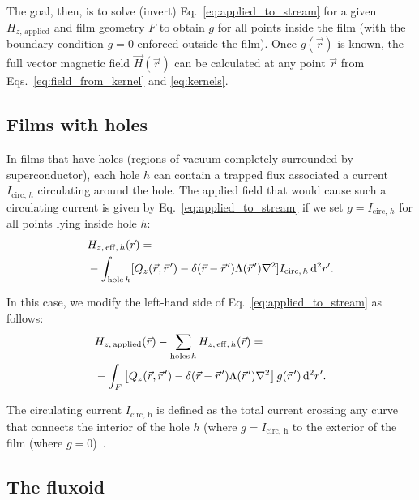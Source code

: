 \documentclass[final,3p,times,twocolumn]{elsarticle}
\newcommand{\pvec}[1]{\vec{#1}\mkern2mu\vphantom{#1}}
\newcounter{bla}
\begin{document}
The goal, then, is to solve (invert) Eq.~\ref{eq:applied_to_stream} for a given $H_{z,\,\mathrm{applied}}$ and film geometry $F$ to obtain $g$ for all points inside the film (with the boundary condition $g=0$ enforced outside the film). Once $g(\vec{r})$ is known, the full vector magnetic field $\vec{H}(\vec{r})$ can be calculated at any point $\vec{r}$
from Eqs.~\ref{eq:field_from_kernel} and \ref{eq:kernels}.

\subsection{Films with holes}
\label{section:model:holes}

In films that have holes (regions of vacuum completely surrounded by superconductor), each hole $h$ can contain a trapped flux associated a current $I_{\mathrm{circ},\,h}$ circulating around the hole. The applied field that would cause such a circulating current is given by Eq.~\ref{eq:applied_to_stream} if we set $g=I_{\mathrm{circ},\,h}$ for all points lying inside hole $h$:
\begin{align}
\begin{split}
    \label{eq:Heff}
    &H_{z,\,\mathrm{eff},\,h}(\vec{r}) = \\
    &-\int_{\mathrm{hole}\,h}[
        Q_z(\vec{r},\pvec{r}')-\delta(\vec{r}-\pvec{r}')\Lambda(\pvec{r}')\nabla^2
    ] I_{\mathrm{circ},\,h} \,\mathrm{d}^2r'.   
\end{split}
\end{align}

In this case, we modify the left-hand side of Eq.~\ref{eq:applied_to_stream} as follows:
\begin{align}
\begin{split}
    \label{eq:Heff_sub}
    &H_{z,\,\mathrm{applied}}(\vec{r}) - \sum_{\mathrm{holes}\,h} H_{z,\,\mathrm{eff},\,h}(\vec{r})
    = \\&-\int_F\left[
        Q_z(\vec{r},\pvec{r}')-\delta(\vec{r}-\pvec{r}')\Lambda(\pvec{r}')\nabla^2\right
    ]g(\pvec{r}')\,\mathrm{d}^2r'.
\end{split}
\end{align}

The circulating current $I_\mathrm{circ,\,h}$ is defined as the total current crossing any curve that connects the interior of the hole $h$ (where $g=I_\mathrm{circ,\,h}$ to the exterior of the film (where $g=0$)~\cite{Khapaev2001-pw,Brandt2005-wj}.

\subsection{The fluxoid}
\label{section:model:fluxoid}
\end{document}
